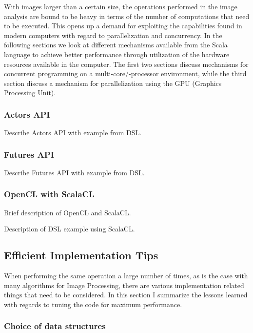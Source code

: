 \documentclass[a4paper,english]{report}
\begin{document}
With images larger than a certain size, the operations performed in
the image analysis are bound to be heavy in terms of the number of
computations that need to be executed. This opens up a demand for
exploiting the capabilities found in modern computers with regard to
parallelization and concurrency. In the following sections we look at
different mechanisms available from the Scala language to achieve
better performance through utilization of the hardware resources
available in the computer. The first two sections discuss mechanisms
for concurrent programming on a multi-core/-processor environment,
while the third section discuss a mechanism for parallelization using
the GPU (Graphics Processing Unit).

\subsubsection{Actors API}
\label{sec:actors}

Describe Actors API with example from DSL.

\subsubsection{Futures API}
\label{sec:futures}

Describe Futures API with example from DSL.

\subsubsection{OpenCL with ScalaCL}
\label{sec:opencl}

Brief description of OpenCL\cite{opencl} and ScalaCL\cite{scalacl}.

Description of DSL example using ScalaCL.

\subsection{Efficient Implementation Tips}
\label{sec:effimpl}

When performing the same operation a large number of times, as is the
case with many algorithms for Image Processing, there are various
implementation related things that need to be considered. In this
section I summarize the lessons learned with regards to tuning the
code for maximum performance.

\subsubsection{Choice of data structures}
\label{sec:datastructures}
\end{document}
